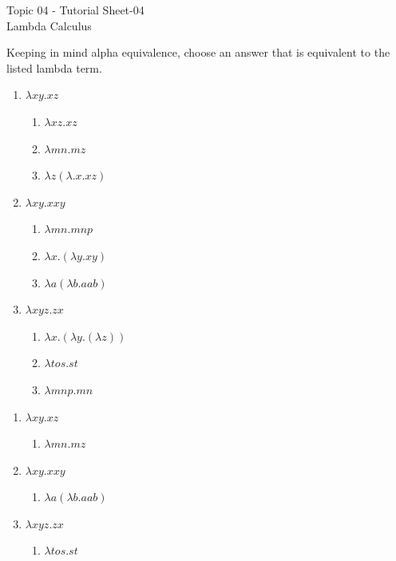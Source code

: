 \documentclass{article}
\newcommand\ExTitle{Lambda Calculus \ }
\newcommand\fullExTitle{Topic 04 - Tutorial Sheet-04\\ \ExTitle }
\begin{document}
\begin{Huge}
	\begin{center}
	\fullExTitle
	\end{center}
\end{Huge}
\begin{exercise}
Keeping in mind  alpha equivalence,  choose an answer that is equivalent to the listed lambda term.
\begin{enumerate}
\item 
$\lambda xy.xz$
\begin{enumerate}
  \item 
  $\lambda xz.xz$
  \item
  $\lambda mn.mz$
  \item
  $\lambda z (\lambda.x.xz)$
  \end{enumerate}
  \item
  $\lambda xy.xxy$
  \begin{enumerate}
  \item 
  $\lambda mn.mnp$
   \item 
  $\lambda x.(\lambda y .xy)$
   \item 
  $\lambda a(\lambda b. aab)$
  \end{enumerate}
  \item
   $\lambda xyz. zx$
 \begin{enumerate}
  \item 
     $\lambda x.(\lambda y.(\lambda  z))$
   \item 
     $\lambda tos.st$
       \item 
     $\lambda mnp.mn$
  \end{enumerate}
   \end{enumerate}
 
 \end{exercise}
\begin{solution}
  \begin{enumerate}
    \item 
    $\lambda xy.xz$
   \begin{enumerate}[start=2]
      \item 
      $\lambda mn.mz$
   
    \end{enumerate}
      \item
      $\lambda xy.xxy$
      \begin{enumerate}[start=3]
       \item 
      $\lambda a(\lambda b. aab)$
      \end{enumerate}
      \item
       $\lambda xyz. zx$
       \begin{enumerate}[start=2]
       \item 
         $\lambda tos.st$
      \end{enumerate}
       \end{enumerate}
      \end{solution}
\end{document}

